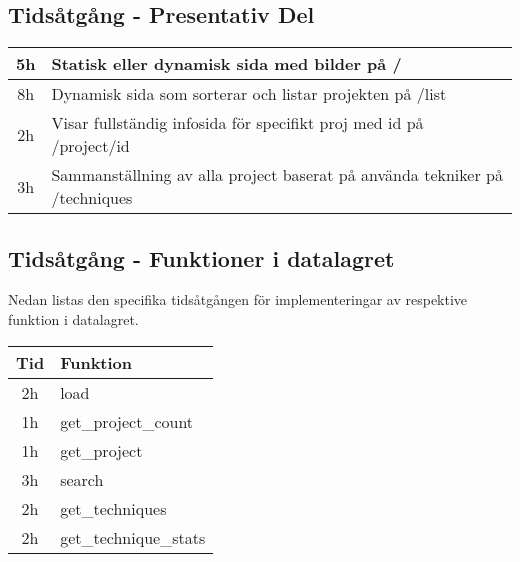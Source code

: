 \documentclass{TDP003mall}
\begin{document}
\subsection{Tidsåtgång - Presentativ Del}
\begin{tabularx}{\linewidth}{|c|X|}
	\hline
	5h & Statisk eller dynamisk sida med bilder på /                                \\
	\hline
	8h & Dynamisk sida som sorterar och listar projekten på /list                   \\
	\hline
	2h & Visar fullständig infosida för specifikt proj med id på /project/id        \\
	\hline
	3h & Sammanställning av alla project baserat på använda tekniker på /techniques \\
	\hline
\end{tabularx}

\subsection{Tidsåtgång - Funktioner i datalagret}
Nedan listas den specifika tidsåtgången för implementeringar av respektive funktion i datalagret.

\begin{tabularx}{\linewidth}{|c|X|}
	\hline
	Tid & Funktion              \\
	\hline
	2h  & load                  \\
	\hline
	1h  & get\_project\_count   \\
	\hline
	1h  & get\_project          \\
	\hline
	3h  & search                \\
	\hline
	2h  & get\_techniques       \\
	\hline
	2h  & get\_technique\_stats \\
	\hline
\end{tabularx}
\end{document}
